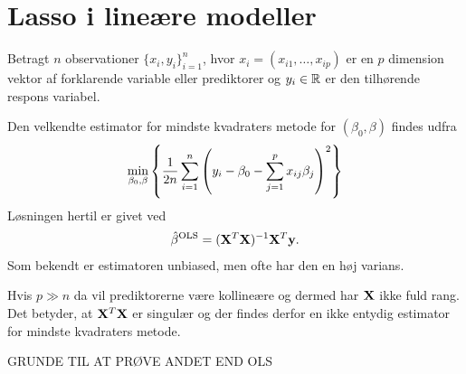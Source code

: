 \chapter{Lasso i lineære modeller}

Betragt \(n\) observationer \(\{x_i, y_i\}_{i=1}^n \), hvor $x_i=(x_{i1}, \ldots, x_{ip})$ er en $p$ dimension vektor af forklarende variable eller prediktorer og $y_i \in \mathbb{R}$ er den tilhørende respons variabel.



Den velkendte estimator for mindste kvadraters metode for $(\beta_0, \beta)$ findes udfra
\begin{align*}
\min_{\beta_0, \beta} \cbr{\frac{1}{2n} \sum_{i=1}^n \del{y_i - \beta_0 - \sum_{j=1}^p x_{ij} \beta_j}^2}
\end{align*}
Løsningen hertil er givet ved
\begin{align*}
\hat{\beta}^{\text{OLS}} = (\mathbf{X}^T \mathbf{X})^{-1} \mathbf{X}^T \mathbf{y}.
\end{align*}
Som bekendt er estimatoren unbiased, men ofte har den en høj varians.


Hvis \(p \gg n\) da vil prediktorerne være kollineære og dermed har \(\mathbf{X}\) ikke fuld rang.
Det betyder, at $\mathbf{X}^T \mathbf{X}$ er singulær og der findes derfor en ikke entydig estimator for mindste kvadraters metode.


GRUNDE TIL AT PRØVE ANDET END OLS




